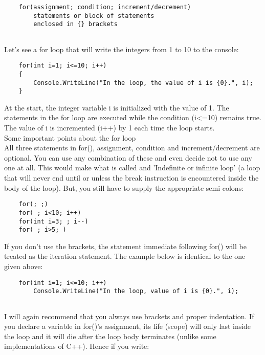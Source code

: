 \begin{lstlisting}
    for(assignment; condition; increment/decrement)
        statements or block of statements
        enclosed in {} brackets
        
\end{lstlisting}

Let's see a for loop that will write the integers from 1 to 10 to the console:


\begin{lstlisting}
    for(int i=1; i<=10; i++)
    {
        Console.WriteLine("In the loop, the value of i is {0}.", i);
    }    
\end{lstlisting}

At the start, the integer variable i is initialized with the value of 1. The statements in the for loop are executed while
the condition (i<=10) remains true. The value of i is incremented (i++) by 1 each time the loop starts.\\

Some important points about the for loop\\

All three statements in for(), assignment, condition and increment/decrement are optional. You can use any
combination of these and even decide not to use any one at all. This would make what is called and ’Indefinite or
infinite loop’ (a loop that will never end until or unless the break instruction is encountered inside the body of the
loop). But, you still have to supply the appropriate semi colons:

\begin{lstlisting}
    for(; ;)
    for( ; i<10; i++)
    for(int i=3; ; i--)
    for( ; i>5; )        
\end{lstlisting}

If you don’t use the {} brackets, the statement immediate following for() will be treated as the iteration statement.
The example below is identical to the one given above:

\begin{lstlisting}
    for(int i=1; i<=10; i++)
        Console.WriteLine("In the loop, value of i is {0}.", i);
        
\end{lstlisting}

I will again recommend that you always use {} brackets and proper indentation.
If you declare a variable in for()’s assignment, its life (scope) will only last inside the loop and it will die after the
loop body terminates (unlike some implementations of C++). Hence if you write:

